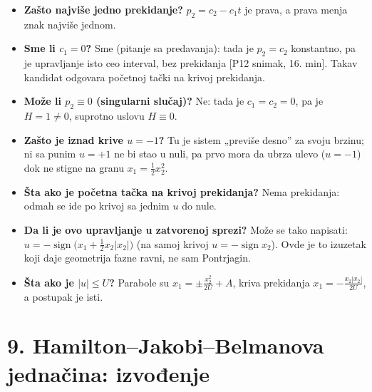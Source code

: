 \documentclass[11pt,a4paper,parskip=half,headsepline,numbers=noenddot]{scrartcl}
\DeclareRobustCommand{\izvor}[1]{{\small\color{izvorC}[#1]}}
\begin{document}
\begin{itemize}
\item \textbf{Zašto najviše jedno prekidanje?} \(p_2 = c_2 - c_1t\) je prava, a prava menja znak najviše jednom.
\item \textbf{Sme li \(c_1 = 0\)?} Sme (pitanje sa predavanja): tada je \(p_2 = c_2\) konstantno, pa je upravljanje isto ceo interval, bez prekidanja \izvor{P12 snimak, 16. min}. Takav kandidat odgovara početnoj tački na krivoj prekidanja.
\item \textbf{Može li \(p_2 \equiv 0\) (singularni slučaj)?} Ne: tada je \(c_1 = c_2 = 0\), pa je \(H = 1 \ne 0\), suprotno uslovu \(H \equiv 0\).
\item \textbf{Zašto je iznad krive \(u = -1\)?} Tu je sistem „previše desno'' za svoju brzinu; ni sa punim \(u = +1\) ne bi stao u nuli, pa prvo mora da ubrza ulevo (\(u = -1\)) dok ne stigne na granu \(x_1 = \frac12x_2^2\).
\item \textbf{Šta ako je početna tačka na krivoj prekidanja?} Nema prekidanja: odmah se ide po krivoj sa jednim \(u\) do nule.
\item \textbf{Da li je ovo upravljanje u zatvorenoj sprezi?} Može se tako napisati: \(u = -\operatorname{sign}\big(x_1 + \frac12x_2|x_2|\big)\) (na samoj krivoj \(u = -\operatorname{sign}x_2\)). Ovde je to izuzetak koji daje geometrija fazne ravni, ne sam Pontrjagin.
\item \textbf{Šta ako je \(|u| \le U\)?} Parabole su \(x_1 = \pm\frac{x_2^2}{2U} + A\), kriva prekidanja \(x_1 = -\frac{x_2|x_2|}{2U}\), a postupak je isti.
\end{itemize}

\section{9. Hamilton--Jakobi--Belmanova jednačina: izvođenje}
\end{document}

